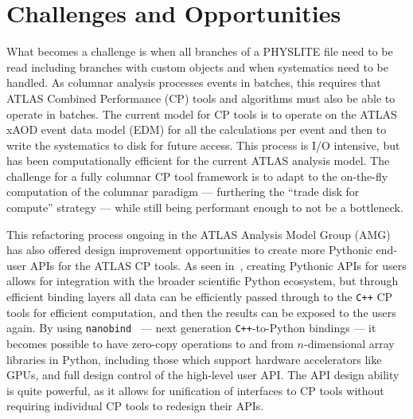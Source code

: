 \section{Challenges and Opportunities}\label{sec:challenges}

What becomes a challenge is when all branches of a PHYSLITE file need to be read including branches with custom objects and when systematics need to be handled.
As columnar analysis processes events in batches, this requires that ATLAS Combined Performance (CP) tools and algorithms must also be able to operate in batches.
The current model for CP tools is to operate on the ATLAS xAOD event data model (EDM) for all the calculations per event and then to write the systematics to disk for future access.
This process is I/O intensive, but has been computationally efficient for the current ATLAS analysis model.
The challenge for a fully columnar CP tool framework is to adapt to the on-the-fly computation of the columnar paradigm --- furthering the ``trade disk for compute'' strategy --- while still being performant enough to not be a bottleneck.

This refactoring process ongoing in the ATLAS Analysis Model Group (AMG) has also offered design improvement opportunities to create more Pythonic end-user APIs for the ATLAS CP tools.
As seen in~, creating Pythonic APIs for users allows for integration with the broader scientific Python ecosystem, but through efficient binding layers all data can be efficiently passed through to the \texttt{C++} CP tools for efficient computation, and then the results can be exposed to the users again.
By using \texttt{nanobind}~\cite{nanobind} --- next generation \texttt{C++}-to-Python bindings --- it becomes possible to have zero-copy operations to and from $n$-dimensional array libraries in Python, including those which support hardware accelerators like GPUs, and full design control of the high-level user API.
The API design ability is quite powerful, as it allows for unification of interfaces to CP tools without requiring individual CP tools to redesign their APIs.

